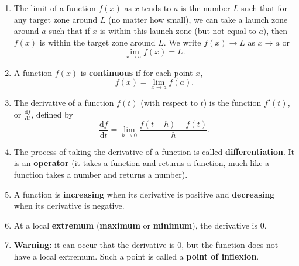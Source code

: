 \documentclass{article}
\newcommand{\deriv}[2]{\frac{\mathrm{d}#1}{\mathrm{d}#2}}
\begin{document}
\begin{enumerate}
	\item The limit of a function $f(x)$ as $x$ tends to $a$ is the number $L$ such that for any target zone around $L$ (no matter how small), we can take a launch zone around $a$ such that if $x$ is within this launch zone (but not equal to $a$), then $f(x)$ is within the target zone around $L$. We write $f(x)\to L$ as $x\to a$ or
		\[\lim_{x\to a}f(x)=L.\]
	\item A function $f(x)$ is \textbf{continuous} if for each point $x$,
		\[f(x)=\lim_{x\to a}f(a).\]
	\item The derivative of a function $f(t)$ (with respect to $t$) is the function $f'(t)$, or $\deriv{f}{t}$, defined by
		\[\deriv{f}{t}=\lim_{h\to 0}\frac{f(t+h)-f(t)}{h}.\]
	\item The process of taking the derivative of a function is called \textbf{differentiation}. It is an \textbf{operator} (it takes a function and returns a function, much like a function takes a number and returns a number).
	\item A function is \textbf{increasing} when its derivative is positive and \textbf{decreasing} when its derivative is negative.
	\item At a local \textbf{extremum} (\textbf{maximum} or \textbf{minimum}), the derivative is 0.
	\item \textbf{Warning:} it can occur that the derivative is 0, but the function does not have a local extremum. Such a point is called a \textbf{point of inflexion}.
\end{enumerate}
\end{document}
